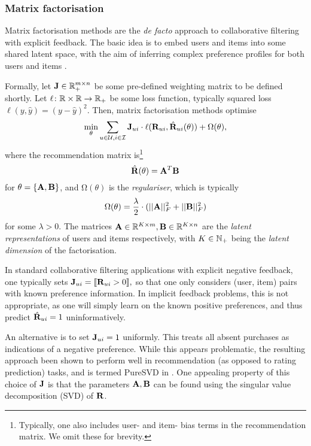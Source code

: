 \subsubsection{Matrix factorisation}

Matrix factorisation methods are the \emph{de facto} approach to collaborative filtering with explicit feedback.
The basic idea is to embed users and items into some shared latent space, with the aim of inferring complex preference profiles for both users and items \citep{Srebro:2003, Koren:2009}.

Formally, let $\mathbf{J} \in \mathbb{R}_+^{m \times n}$ be some pre-defined weighting matrix to be defined shortly.
Let $\ell \colon \mathbb{R} \times \mathbb{R} \to \mathbb{R}_+$ be some loss function, typically squared loss $\ell( y, \hat{y} ) = (y - \hat{y})^2$.
Then, matrix factorisation methods optimise
\begin{equation}
\label{eqn:wrmf}
\min_{ \theta } \sum_{ u \in \mathcal{U}, i \in \mathcal{I} } \mathbf{J}_{ui} \cdot \ell( \mathbf{R}_{ui}, \hat{\mathbf{R}}_{ui}( \theta ) ) + \mathrm{\Omega}( \theta ) ,
\end{equation}
where the recommendation matrix is\footnote{Typically, one also includes user- and item- bias terms in the recommendation matrix. We omit these for brevity.}
\begin{equation}
\label{eqn:factorisation}
\hat{\mathbf{R}}(\theta) = \mathbf{A}^T \mathbf{B}
\end{equation}
for $\theta = \{ \mathbf{A}, \mathbf{B} \}$, 
and $\mathrm{\Omega}( \theta )$ is the \emph{regulariser}, which is typically
$$\mathrm{\Omega}( \theta ) = \frac{\lambda}{2} \cdot ( ||\mathbf{A}||_F^2 + ||\mathbf{B}||_F^2 )$$
for some $\lambda > 0$.
The matrices $\mathbf{A} \in \mathbb{R}^{K \times m}, \mathbf{B} \in \mathbb{R}^{K \times n}$ are the \emph{latent representations} of users and items respectively, with $K \in \mathbb{N}_+$ being the \emph{latent dimension} of the factorisation.

In standard collaborative filtering applications with explicit negative feedback, one typically sets \citep{Koren:2009} $\mathbf{J}_{ui} = \llbracket  \mathbf{R}_{ui} > 0  \rrbracket,$
so that one only considers (user, item) pairs with known preference information.
In implicit feedback problems, this is not appropriate, as one will simply learn on the known positive preferences, and thus predict $\hat{\mathbf{R}}_{ui} = 1$ uninformatively.

An alternative is to set $\mathbf{J}_{ui} = 1$ uniformly. This treats all absent purchases as indications of a negative preference. 
While this appears problematic, the resulting approach been shown to perform well in recommendation (as opposed to rating prediction) tasks, and is termed PureSVD in \citep{Cremonesi:2010}.
One appealing property of this choice of $\mathbf{J}$ is that the parameters $\mathbf{A}, \mathbf{B}$ can be found using the singular value decomposition (SVD) of $\mathbf{R}$. 


